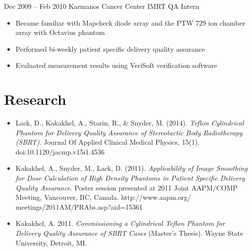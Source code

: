 \documentclass{tccv-grey}
\begin{document}
\begin{eventlist}
    \item{Dec 2009 -- Feb 2010}
         {Karmanos Cancer Center}
         {IMRT QA Intern}
\end{eventlist}
\vspace{-\topsep}
\begin{itemize}[noitemsep]
    \item Became familiar with Mapcheck diode array and the PTW 729 ion chamber array with Octavius phantom
    \item Performed bi-weekly patient specific delivery quality assurance
    \item Evaluated measurement results using VeriSoft verification software
\end{itemize}

\section{Research}
\begin{itemize} \itemsep -2pt %
    \item Lack, D., Kakakhel, A., Starin, R., \& Snyder, M. (2014). \textit{Teflon Cylindrical Phantom for Delivery Quality Assurance of Stereotactic Body Radiotherapy (SBRT)}. Journal Of Applied Clinical Medical Physics, 15(1). doi:10.1120/jacmp.v15i1.4536
    \item Kakakhel, A., Snyder, M., Lack, D. (2011). \textit{Applicability of Image Smoothing for Dose Calculation of High Density Phantoms in Patient Specific Delivery Quality Assurance}. Poster session presented at 2011 Joint AAPM/COMP Meeting, Vancouver, BC, Canada. http://www.aapm.org/ \\ meetings/2011AM/PRAbs.asp?aid=15361
    \item Kakakhel, A. 2011. \textit{Commissioning a Cylindrical Teflon Phantom for Delivery Quality Assurance of SBRT Cases} (Master's Thesis). Wayne State University, Detroit, MI.
\end{itemize}

\end{document}
